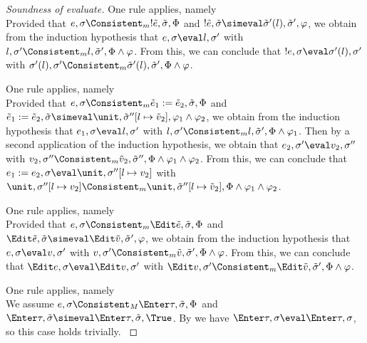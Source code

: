 \begin{proof}[Soundness of evaluate]
    {One rule applies, namely \\
    Provided that $e,\sigma\Consistent_m !\tilde{e},\tilde{\sigma},\Phi$ and $!\tilde{e},\tilde{\sigma}\simeval\tilde{\sigma}'(l),\tilde{\sigma}',\phi$,
    we obtain from the induction hypothesis that $e,\sigma\eval l,\sigma'$ with $l,\sigma'\Consistent_m l,\tilde{\sigma}',\Phi\land\phi$.
    From this, we can conclude that $!e,\sigma\eval \sigma'(l),\sigma'$ with $\sigma'(l),\sigma'\Consistent_m \tilde{\sigma}'(l),\tilde{\sigma}',\Phi\land\phi$.
  }

    {
    One rule applies, namely \\
    Provided that $e,\sigma\Consistent_m\tilde{e}_1:=\tilde{e}_2,\tilde{\sigma},\Phi$ and $\tilde{e}_1:=\tilde{e}_2,\tilde{\sigma}\simeval\unit,\tilde{\sigma}''[l\mapsto \tilde{v}_2],\phi_1\land\phi_2$,
    we obtain from the induction hypothesis that $e_1,\sigma\eval l,\sigma'$ with $l,\sigma'\Consistent_m l,\tilde{\sigma}',\Phi\land\phi_1$.
    Then by a second application of the induction hypothesis, we obtain that $e_2,\sigma'\eval v_2,\sigma''$ with $v_2,\sigma''\Consistent_m\tilde{v}_2,\tilde{\sigma}'',\Phi\land\phi_1\land\phi_2$.
    From this, we can conclude that $e_1 := e_2,\sigma\eval \unit,\sigma''[l\mapsto v_2]$ with $\unit,\sigma''[l\mapsto v_2]\Consistent_m\unit,\tilde{\sigma}''[l\mapsto\tilde{v}_2],\Phi\land\phi_1\land\phi_2$.
    }

    {One rule applies, namely \\
    Provided that $e,\sigma\Consistent_m \Edit\tilde{e},\tilde{\sigma},\Phi$ and $\Edit\tilde{e},\tilde{\sigma}\simeval\Edit\tilde{v},\tilde{\sigma}',\phi$,
    we obtain from the induction hypothesis that $e,\sigma\eval v,\sigma'$ with $v,\sigma'\Consistent_m \tilde{v},\tilde{\sigma}',\Phi\land\phi$.
    From this, we can conclude that $\Edit e,\sigma\eval \Edit v,\sigma'$ with $\Edit v,\sigma'\Consistent_m \Edit\tilde{v},\tilde{\sigma}',\Phi\land\phi$.

    }

    {
    One rule applies, namely \\
    We assume $e,\sigma\Consistent_M\Enter\tau,\tilde{\sigma},\Phi$ and $\Enter\tau,\tilde{\sigma}\simeval\Enter\tau,\tilde{\sigma},\True$.
    By  we have $\Enter\tau,\sigma\eval \Enter\tau,\sigma$, so this case holds trivially.
    }


\end{proof}
